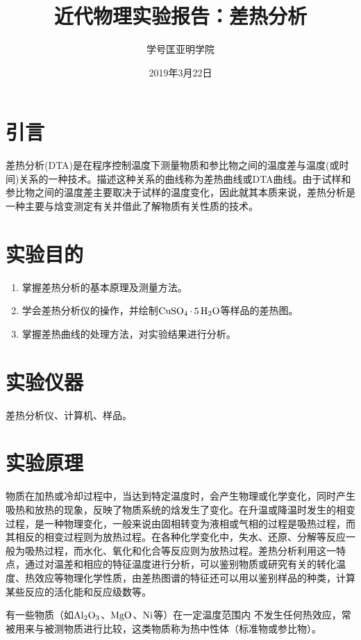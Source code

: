 \documentclass[a4paper]{article}
\title{近代物理实验报告：差热分析}
\author{\quad 学号\quad 匡亚明学院}
\date{2019年3月22日}
\begin{document}
\maketitle

\tableofcontents

\newpage



\section{引言}
差热分析(DTA)是在程序控制温度下测量物质和参比物之间的温度差与温度(或时间)关系的一种技术。描述这种关系的曲线称为差热曲线或DTA曲线。由于试样和参比物之间的温度差主要取决于试样的温度变化，因此就其本质来说，差热分析是一种主要与焓变测定有关并借此了解物质有关性质的技术。

\section{实验目的}
\begin{enumerate}
\item 掌握差热分析的基本原理及测量方法。
\item 学会差热分析仪的操作，并绘制$ \ce{CuSO_4 . 5H_2O} $等样品的差热图。
\item 掌握差热曲线的处理方法，对实验结果进行分析。
\end{enumerate}

\section{实验仪器}
差热分析仪、计算机、样品。

\section{实验原理}
物质在加热或冷却过程中，当达到特定温度时，会产生物理或化学变化，同时产生吸热和放热的现象，反映了物质系统的焓发生了变化。在升温或降温时发生的相变过程，是一种物理变化，一般来说由固相转变为液相或气相的过程是吸热过程，而其相反的相变过程则为放热过程。在各种化学变化中，失水、还原、分解等反应一般为吸热过程，而水化、氧化和化合等反应则为放热过程。差热分析利用这一特点，通过对温差和相应的特征温度进行分析，可以鉴别物质或研究有关的转化温度、热效应等物理化学性质，由差热图谱的特征还可以用以鉴别样品的种类，计算某些反应的活化能和反应级数等。

有一些物质（如$ \ce{Al_2O_3} $、$ \ce{MgO} $、$ \ce{Ni} $等）在一定温度范围内
不发生任何热效应，常被用来与被测物质进行比较，这类物质称为热中性体（标准物或参比物）。
\end{document}
